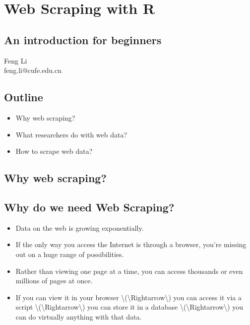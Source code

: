 \section{Web Scraping with R}\label{web-scraping-with-r}

\subsection{An introduction for
beginners}\label{an-introduction-for-beginners}

Feng Li\\
feng.li@cufe.edu.cn

\subsection{Outline}\label{outline}

\begin{itemize}
\tightlist
\item
  Why web scraping?
\item
  What researchers do with web data?
\item
  How to scrape web data?
\end{itemize}

\subsection{Why web scraping?}\label{why-web-scraping}

\subsection{Why do we need Web
Scraping?}\label{why-do-we-need-web-scraping}

\begin{itemize}
\item
  Data on the web is growing exponentially.
\item
  If the only way you access the Internet is through a browser, you're
  missing out on a huge range of possibilities.
\item
  Rather than viewing one page at a time, you can access thousands or
  even millions of pages at once.
\item
  If you can view it in your browser
  \textbackslash{}(\textbackslash{}Rightarrow\textbackslash{}) you can
  access it via a script
  \textbackslash{}(\textbackslash{}Rightarrow\textbackslash{}) you can
  store it in a database
  \textbackslash{}(\textbackslash{}Rightarrow\textbackslash{}) you can
  do virtually anything with that data.
\end{itemize}


